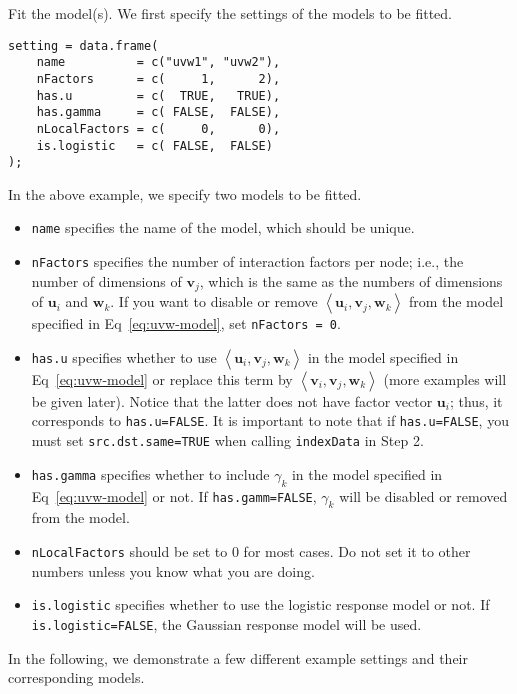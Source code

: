 \documentclass[10pt]{article}
\newcommand{\parahead}[1]{\vspace{0.15in}\noindent{\bf #1:}}
\begin{document}
\parahead{Step 3}
Fit the model(s).  We first specify the settings of the models to be fitted.
{\small\begin{verbatim}
setting = data.frame(
    name          = c("uvw1", "uvw2"),
    nFactors      = c(     1,      2),
    has.u         = c(  TRUE,   TRUE),
    has.gamma     = c( FALSE,  FALSE),
    nLocalFactors = c(     0,      0),
    is.logistic   = c( FALSE,  FALSE)
);
\end{verbatim}}
\noindent In the above example, we specify two models to be fitted.
\begin{itemize}
\item {\tt name} specifies the name of the model, which should be unique.
\item {\tt nFactors} specifies the number of interaction factors per node; i.e., the number of dimensions of $\bm{v}_j$, which is the same as the numbers of dimensions of $\bm{u}_i$ and $\bm{w}_k$.  If you want to disable or remove $\left<\bm{u}_i, \bm{v}_j, \bm{w}_k\right>$ from the model specified in Eq~\ref{eq:uvw-model}, set {\tt nFactors = 0}.
\item {\tt has.u} specifies whether to use $\left<\bm{u}_i, \bm{v}_j, \bm{w}_k\right>$ in the model specified in Eq~\ref{eq:uvw-model} or replace this term by $\left<\bm{v}_i, \bm{v}_j, \bm{w}_k\right>$ (more examples will be given later).  Notice that the latter does not have factor vector $\bm{u}_i$; thus, it corresponds to {\tt has.u=FALSE}.  It is important to note that if {\tt has.u=FALSE}, you must set {\tt src.dst.same=TRUE} when calling {\tt indexData} in Step 2.
\item {\tt has.gamma} specifies whether to include $\gamma_k$ in the model specified in Eq~\ref{eq:uvw-model} or not.  If {\tt has.gamm=FALSE}, $\gamma_k$ will be disabled or removed from the model.
\item {\tt nLocalFactors} should be set to 0 for most cases.  Do not set it to other numbers unless you know what you are doing.
\item {\tt is.logistic} specifies whether to use the logistic response model or not. If {\tt is.logistic=FALSE}, the Gaussian response model will be used.
\end{itemize}
In the following, we demonstrate a few different example settings and their corresponding models.
\end{document}
